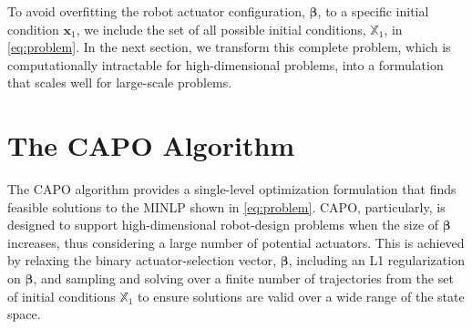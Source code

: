 To avoid overfitting the robot actuator configuration, $\boldsymbol{\beta}$, to a specific initial condition $\textbf{x}_1$, we include the set of all possible initial conditions, $\mathbb{X}_1$, in \eqref{eq:problem}. In the next section, we transform this complete problem, which is computationally intractable for high-dimensional problems, into a formulation that scales well for large-scale problems.
\section{The CAPO Algorithm}\label{sec:capo:capo_alg}
The CAPO algorithm provides a single-level optimization formulation that finds feasible solutions to the MINLP shown in \eqref{eq:problem}. CAPO, particularly, is designed to support high-dimensional robot-design problems when the size of $\boldsymbol{\beta}$ increases, thus considering a large number of potential actuators. This is achieved by relaxing the binary actuator-selection vector, $\boldsymbol{\beta}$, including an L1 regularization on $\boldsymbol{\beta}$, and sampling and solving over a finite number of trajectories from the set of initial conditions $\mathbb{X}_1$ to ensure solutions are valid over a wide range of the state space.

